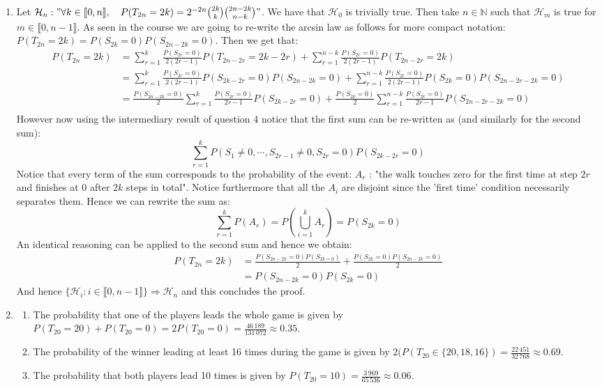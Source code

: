 \documentclass[10pt,a4paper]{article}
\begin{document}
\begin{enumerate}
\item Let $\mathcal{H}_n : "  \forall k \in \llbracket 0, n \rrbracket, \quad P(T_{2n} = 2k) = 2^{-2n} \binom{2k}{k} \binom{2n - 2k}{n - k}"$. We have that $\mathcal{H}_0$ is trivially true. Then take $n \in \mathbb{N} $ such that $\mathcal{H}_m$ is true for $m \in \llbracket 0, n - 1 \rrbracket$. As seen in the course we are going to re-write the arcsin law as follows for more compact notation: $P(T_{2n} = 2k) = P(S_{2k} = 0)P(S_{2n - 2k} = 0)$. Then we get that:
\begin{align*}
P(T_{2n} = 2k) &= \sum_{r = 1}^k \frac{P(S_{2r} = 0)}{2(2r - 1)} P(T_{2n - 2r} = 2k - 2r) + \sum_{r = 1}^{n - k} \frac{P(S_{2r} = 0)}{2(2r - 1)} P(T_{2n - 2r} = 2k)\\
&= \sum_{r = 1}^k \frac{P(S_{2r} = 0)}{2(2r - 1)} P(S_{2k - 2r} = 0)P(S_{2n - 2k} = 0) + \sum_{r = 1}^{n - k} \frac{P(S_{2r} = 0)}{2(2r - 1)} P(S_{2k} = 0)P(S_{2n - 2r - 2k} = 0)\\
&= \frac{P(S_{2n - 2k} = 0)}{2}\sum_{r = 1}^k \frac{P(S_{2r} = 0)}{2r - 1} P(S_{2k - 2r} = 0) + \frac{P(S_{2k} = 0)}{2}\sum_{r = 1}^{n - k} \frac{P(S_{2r} = 0)}{2r - 1} P(S_{2n - 2r - 2k} = 0)\\ 
\end{align*}
However now using the intermediary result of question 4 notice that the first sum can be re-written as (and similarly for the second sum):
\[
\sum_{r = 1}^k P(S_1 \neq 0, \cdots, S_{2r - 1} \neq 0, S_{2r} = 0) P(S_{2 k - 2r} = 0)
\]
Notice that every term of the sum corresponds to the probability of the event: $A_r$ : "the walk touches zero for the first time at step $2r$ and finishes at 0 after $2k$ steps in total". Notice furthermore that all the $A_i$ are disjoint since the 'first time' condition necessarily separates them. Hence we can rewrite the sum as:
\[
\sum_{r = 1}^k P(A_r) = P(\bigcup_{i = 1}^k A_r) = P(S_{2k} = 0)
\]
An identical reasoning can be applied to the second sum and hence we obtain:
\begin{align*}
P(T_{2n} = 2k) &= \frac{P(S_{2n - 2k} = 0)P(S_{2k = 0})}{2} + \frac{P(S_{2k} = 0)P(S_{2n - 2k} = 0)}{2}\\
&= P(S_{2n - 2k} = 0) P(S_{2k} = 0)
\end{align*}
And hence $\{\mathcal{H}_i : i \in \llbracket 0, n- 1 \rrbracket\} \Rightarrow \mathcal{H}_n$ and this concludes the proof.

\item \begin{enumerate}
\item The probability that one of the players leads the whole game is given by $P(T_{20} = 20) + P(T_{20} = 0) = 2P(T_{20} = 0) = \frac{46\,189}{131\,072} \approx 0.35$.  
\item The probability of the winner leading at least 16 times during the game is given  by $2(P(T_{20} \in \{20, 18, 16\}) = \frac{22\,451}{32\,768} \approx 0.69$. 
\item The probability that both players lead 10 times is given by $P(T_{20} = 10) = \frac{3\,969}{65\,536} \approx 0.06$. 
\end{enumerate}


\end{enumerate}
\end{document}
